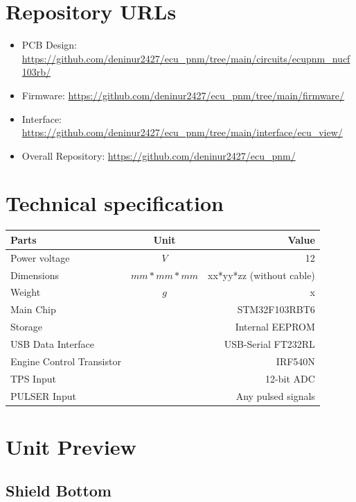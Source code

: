 \documentclass[a4paper,12pt,oneside,pdflatex,italian,final,twocolumn]{article}
\begin{document}
	\raggedright

	\section{Repository URLs}
	
	\begin{itemize}
		\item PCB Design: \url{https://github.com/deninur2427/ecu_pnm/tree/main/circuits/ecupnm_nucf103rb/}
		
		\item Firmware: \url{https://github.com/deninur2427/ecu_pnm/tree/main/firmware/}
		
		\item Interface: \url{https://github.com/deninur2427/ecu_pnm/tree/main/interface/ecu_view/}
		
		\item Overall Repository: \url{https://github.com/deninur2427/ecu_pnm/}
	\end{itemize}

	\section{Technical specification}
	\centering
	\begin{tabular}{lcr}
		\toprule
		Parts & Unit & Value \\
		\midrule
		Power voltage & $V$ & 12 \\
		Dimensions & $mm*mm*mm$ & xx*yy*zz (without cable) \\
		Weight & $g$ & x \\
		Main Chip & & STM32F103RBT6 \\
		Storage & & Internal EEPROM \\
		USB  Data Interface & & USB-Serial FT232RL \\
		Engine Control Transistor & & IRF540N \\
		TPS Input & & 12-bit ADC \\
		PULSER Input & & Any pulsed signals \\
		\bottomrule
	\end{tabular}
	
	\raggedright
	
	\newpage
	\section{Unit Preview}
	
	\subsection{Shield Bottom}
	
\end{document}
